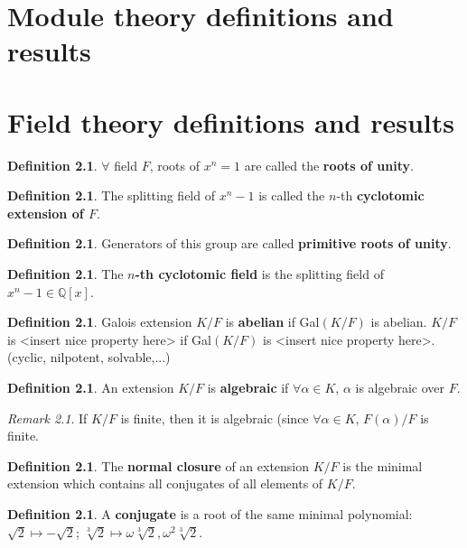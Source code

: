 \documentclass[9pt,reqno,twoside]{amsbook}
\theoremstyle{plain}
\numberwithin{section}{chapter}
\numberwithin{equation}{chapter}
\theoremstyle{definition}
\newtheorem{Def}[theorem]{Definition}
\theoremstyle{remark}
\newtheorem{rem}[theorem]{Remark}
\theoremstyle{plain}
\newcommand{\Q}{\mathbb{Q}}
\begin{document}
\chapter{Module theory definitions and results}

\chapter{Field theory definitions and results}

\begin{Def} 
$\forall$ field $F$, roots of $x^n = 1$ are called the \textbf{roots of unity}. 
\end{Def}
\begin{Def}
The splitting field of $x^n - 1$ is called the $n$-th \textbf{cyclotomic extension of $F$}. 
\end{Def}

\begin{Def}
Generators of this group are called \textbf{primitive roots of unity}. 
\end{Def}

\begin{Def}
The \textbf{$n$-th cyclotomic field} is the splitting field of $x^n - 1 \in \Q[x]$. 
\end{Def}

\begin{Def}
Galois extension $K/F$ is \textbf{abelian} if Gal$(K/F)$ is abelian. $K/F$ is <insert nice property here> if Gal$(K/F)$ is <insert nice property here>. (cyclic, nilpotent, solvable,...)
\end{Def}

\begin{Def}
An extension $K/F$ is \textbf{algebraic} if $\forall \alpha \in K$, $\alpha$ is algebraic over $F$. 
\end{Def}

\begin{rem}
If $K/F$ is finite, then it is algebraic (since $\forall \alpha \in K$, $F(\alpha)/F$ is finite. 
\end{rem}

\begin{Def}
The \textbf{normal closure} of an extension $K/F$ is the minimal extension which contains all conjugates of all elements of $K/F$. 
\end{Def}

\begin{Def}
A \textbf{conjugate} is a root of the same minimal polynomial: $\sqrt{2}\mapsto -\sqrt{2}$; $\sqrt[3]{2} \mapsto \omega\sqrt[3]{2},\omega^2\sqrt[3]{2}$. 
\end{Def}
\end{document}
